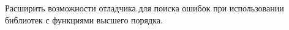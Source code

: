 \begin{frame}
	\frametitle{\insertsection} 
	\framesubtitle{\insertsubsection}
	Расширить возможности отладчика для поиска ошибок при использовании библиотек с функциями высшего порядка.
\end{frame}
